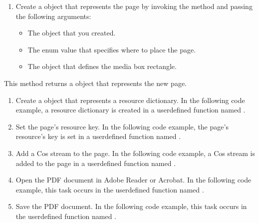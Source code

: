 \documentclass[letterpaper,12pt,english,openany,oneside]{sphinxmanual}
\begin{document}
\begin{sphinxVerbatim}[commandchars=\\\{\}]
    
\end{sphinxVerbatim}
\begin{enumerate}
%
\setcounter{enumi}{3}
\item {} 
Create a  object that represents the page by invoking the  method and passing the following arguments:
\begin{itemize}
\item {} 
The  object that you created.

\item {} 
The  enum value that specifies where to place the page.

\item {} 
The  object that defines the media box rectangle.

\end{itemize}

\end{enumerate}

This method returns a  object that represents the new page.
\begin{enumerate}
%
\setcounter{enumi}{4}
\item {} 
Create a  object that represents a resource dictionary. In the following code example, a resource dictionary is created in a user\sphinxhyphen{}defined function named .

\item {} 
Set the page’s resource key. In the following code example, the page’s resource’s key is set in a user\sphinxhyphen{}defined function named .

\item {} 
Add a Cos stream to the page. In the following code example, a Cos stream is added to the page in a user\sphinxhyphen{}defined function named .

\item {} 
Open the PDF document in Adobe Reader or Acrobat. In the following code example, this task occurs in the user\sphinxhyphen{}defined function named .

\item {} 
Save the PDF document. In the following code example, this task occurs in the user\sphinxhyphen{}defined function named .

\end{enumerate}
\end{document}

